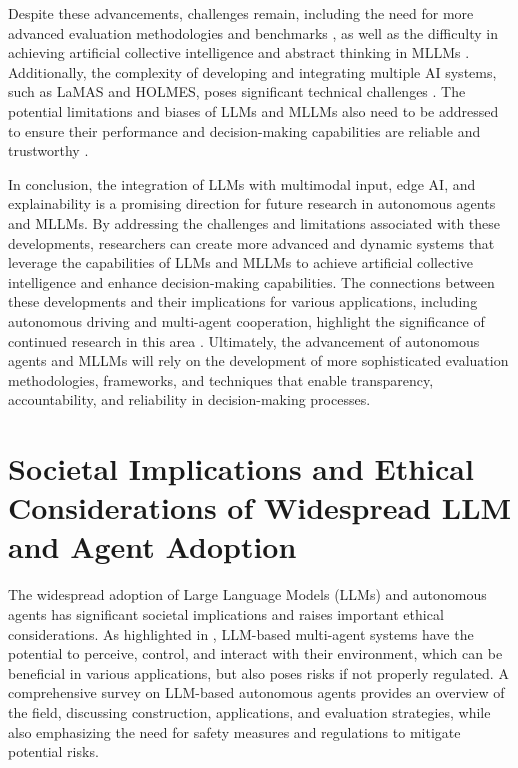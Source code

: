 \documentclass[conference]{IEEEtran}
\begin{document}
Despite these advancements, challenges remain, including the need for more advanced evaluation methodologies and benchmarks \cite{2408.15769}, as well as the difficulty in achieving artificial collective intelligence and abstract thinking in MLLMs \cite{2402.15527}. Additionally, the complexity of developing and integrating multiple AI systems, such as LaMAS and HOLMES, poses significant technical challenges \cite{2412.08442}. The potential limitations and biases of LLMs and MLLMs also need to be addressed to ensure their performance and decision-making capabilities are reliable and trustworthy \cite{2401.06805}.

In conclusion, the integration of LLMs with multimodal input, edge AI, and explainability is a promising direction for future research in autonomous agents and MLLMs. By addressing the challenges and limitations associated with these developments, researchers can create more advanced and dynamic systems that leverage the capabilities of LLMs and MLLMs to achieve artificial collective intelligence and enhance decision-making capabilities. The connections between these developments and their implications for various applications, including autonomous driving and multi-agent cooperation, highlight the significance of continued research in this area \cite{2401.06805, 2411.14033}. Ultimately, the advancement of autonomous agents and MLLMs will rely on the development of more sophisticated evaluation methodologies, frameworks, and techniques that enable transparency, accountability, and reliability in decision-making processes.

\section{Societal Implications and Ethical Considerations of Widespread LLM and Agent Adoption}
The widespread adoption of Large Language Models (LLMs) and autonomous agents has significant societal implications and raises important ethical considerations. As highlighted in \cite{2411.14033}, LLM-based multi-agent systems have the potential to perceive, control, and interact with their environment, which can be beneficial in various applications, but also poses risks if not properly regulated. A comprehensive survey on LLM-based autonomous agents \cite{2308.11432} provides an overview of the field, discussing construction, applications, and evaluation strategies, while also emphasizing the need for safety measures and regulations to mitigate potential risks.
\end{document}
